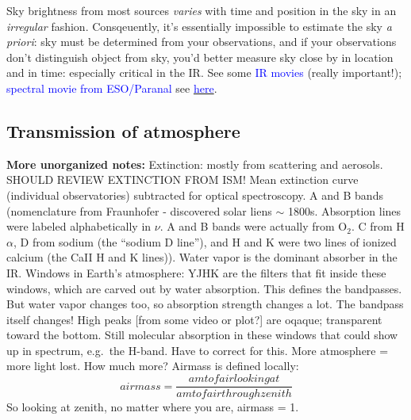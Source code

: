 \documentclass[12pt]{article}
\begin{document}
Sky brightness from most sources \emph{varies} with time and position in the
sky in an \emph{irregular} fashion. Consqeuently, it's essentially impossible
to estimate the sky \emph{a priori}: sky must be determined from your
observations, and if your observations don't distinguish object from
sky, you'd better measure sky close by in location and in time:
especially critical in the IR\@. See some
{\textcolor{blue}{IR movies}} (really important!);
{\textcolor{blue}{spectral movie from ESO/Paranal}} see
\href{https://www.astro.uni-bonn.de/theli/gui/aboutbackground.html}
{\textcolor{blue}{here}}.

\subsection*{Transmission of atmosphere}

\textcolor{myBlue}{\textbf{More unorganized notes:}
    Extinction: mostly from scattering and aerosols. SHOULD REVIEW
    EXTINCTION FROM ISM\@! Mean extinction curve (individual observatories)
    subtracted for optical spectroscopy. A and B bands (nomenclature
    from Fraunhofer - discovered solar liens $\sim$ 1800s.
    Absorption lines were labeled alphabetically in $\nu$. A and B bands
    were actually from O$_2$. C from H$\alpha$, D from sodium (the
    ``sodium D line''), and H and K were two lines of ionized calcium
    (the CaII H and K lines)).
    Water vapor is the dominant absorber in the IR\@.
    Windows in Earth's atmosphere: YJHK are the filters that fit inside
    these windows, which are carved out by water absorption.
    This defines the bandpasses. But water vapor changes too,
    so absorption strength changes a lot. The bandpass itself
    changes! High peaks [from some video or plot?] are oqaque;
    transparent toward the bottom. Still molecular absorption in
    these windows that could show up in spectrum, e.g.\ the H-band.
    Have to correct for this. More atmosphere = more light lost.
    How much more? Airmass is defined locally:
    $$ airmass = \frac{amt of air looking at}{amt of air through zenith}$$
    So looking at zenith, no matter where you are, airmass = 1.
}
\end{document}
